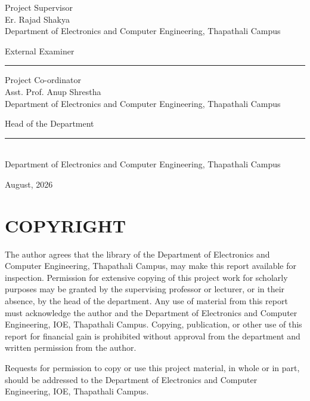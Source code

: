 \documentclass[12pt,a4paper,openany]{report}
\begin{document}
\vspace{2em}
\noindent Project Supervisor\\
Er. Rajad Shakya\\
Department of Electronics and Computer Engineering, Thapathali Campus

\vspace{1em}
\noindent External Examiner\\
\rule{5cm}{0.4pt}

\vspace{1em}
\noindent Project Co-ordinator\\
Asst. Prof. Anup Shrestha\\
Department of Electronics and Computer Engineering, Thapathali Campus

\vspace{1em}
\noindent Head of the Department\\
\rule{5cm}{0.4pt}\\
Department of Electronics and Computer Engineering, Thapathali Campus

\vspace{1em}
\noindent August, 2026

\clearpage

\chapter*{COPYRIGHT}

The author agrees that the library of the Department of Electronics and Computer Engineering, Thapathali Campus, may make this report available for inspection. Permission for extensive copying of this project work for scholarly purposes may be granted by the supervising professor or lecturer, or in their absence, by the head of the department. Any use of material from this report must acknowledge the author and the Department of Electronics and Computer Engineering, IOE, Thapathali Campus. Copying, publication, or other use of this report for financial gain is prohibited without approval from the department and written permission from the author.

Requests for permission to copy or use this project material, in whole or in part, should be addressed to the Department of Electronics and Computer Engineering, IOE, Thapathali Campus.

\clearpage




\end{document}

